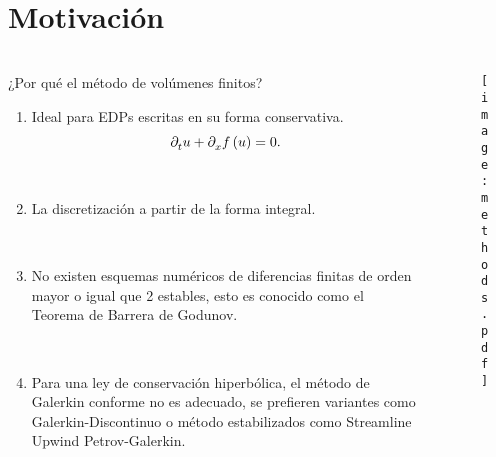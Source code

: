 \section{Motivación}

\begin{frame}
	\frametitle{\secname}
	\begin{columns}
		\begin{column}{.38\paperwidth}
			\begin{alertblock}{¿Por qué el método de volúmenes finitos?}
				\begin{enumerate}
					\item

					      Ideal para EDPs escritas en su forma conservativa.
					      \begin{equation}\label{eq:conservationlaw}
						      \difcp{u}{t}+
						      \difcp{f\left(u\right)}{x}=0.
					      \end{equation}

					      \

					\item

					      La discretización a partir de la forma integral.

					      \

					\item

					      No existen esquemas numéricos de diferencias finitas
					      de orden mayor o igual que 2 estables, esto es conocido
					      como el Teorema de Barrera de Godunov.

					      \

					\item

					      Para una ley de conservación hiperbólica, el método de Galerkin
					      conforme no es adecuado, se prefieren variantes como
					      Galerkin-Discontinuo o método estabilizados como
					      Streamline Upwind Petrov-Galerkin.
				\end{enumerate}
			\end{alertblock}
		\end{column}
		\begin{column}{.58\paperwidth}
			\begin{figure}[ht!]
				\centering
				\texttt{[image: methods.pdf]}
			\end{figure}
		\end{column}
	\end{columns}
\end{frame}

